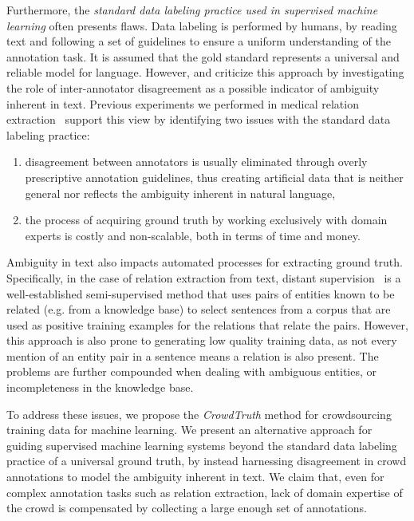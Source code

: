 Furthermore, the \textit{standard data labeling practice used in supervised machine learning} often presents flaws. Data labeling is performed by humans, by reading text and following a set of guidelines to ensure a uniform understanding of the annotation task.  It is assumed that the gold standard represents a universal and reliable model for language. However, \cite{schaekermann2016} and \cite{Bayerl2011} criticize this approach by investigating the role of inter-annotator disagreement as a possible indicator of ambiguity inherent in text.  Previous experiments we performed in medical relation extraction~\cite{aroyo2013crowd} support this view by identifying two issues with the standard data labeling practice:

\begin{enumerate}

\item disagreement between annotators is usually eliminated through overly prescriptive annotation guidelines, thus creating artificial data that is neither general nor reflects the ambiguity inherent in natural language,

\item the process of acquiring ground truth by working exclusively with domain experts is costly and non-scalable, both in terms of time and money.

\end{enumerate}

Ambiguity in text also impacts automated processes for extracting ground truth.  Specifically, in the case of relation extraction from text, distant supervision~\cite{mintz2009distant,Welty:2010:LSR} is a well-established semi-supervised method that uses pairs of entities known to be related (e.g. from a knowledge base) to select sentences from a corpus that are used as positive training examples for the relations that relate the pairs. However, this approach is also prone to generating low quality training data, as not every mention of an entity pair in a sentence means a relation is also present. The problems are further compounded when dealing with ambiguous entities, or incompleteness in the knowledge base.

To address these issues, we propose the {\em CrowdTruth} method for crowdsourcing training data for machine learning. We present an alternative approach for guiding supervised machine learning systems beyond the standard data labeling practice of a universal ground truth, by instead harnessing disagreement in crowd annotations to model the ambiguity inherent in text.  We claim that, even for complex annotation tasks such as relation extraction, lack of domain expertise of the crowd is compensated by collecting a large enough set of annotations.

